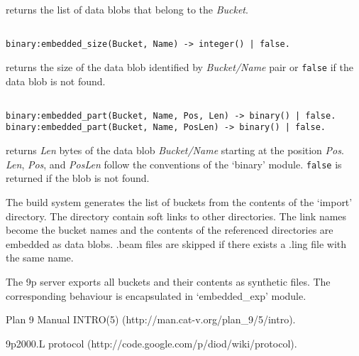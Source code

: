 returns the list of data blobs that belong to the \emph{Bucket}.

\begin{adjustwidth}{2.5em}{2.5em}
\begin{verbatim}

binary:embedded_size(Bucket, Name) -> integer() | false.

\end{verbatim}
\end{adjustwidth}

returns the size of the data blob identified by \emph{Bucket\slash Name} pair or \texttt{false} if
the data blob is not found.

\begin{adjustwidth}{2.5em}{2.5em}
\begin{verbatim}

binary:embedded_part(Bucket, Name, Pos, Len) -> binary() | false.
binary:embedded_part(Bucket, Name, PosLen) -> binary() | false.

\end{verbatim}
\end{adjustwidth}

returns \emph{Len} bytes of the data blob \emph{Bucket\slash Name} starting at the position
\emph{Pos}. \emph{Len}, \emph{Pos}, and \emph{PosLen} follow the conventions of the `binary' module.
\texttt{false} is returned if the blob is not found.

The build system generates the list of buckets from the contents of the `import'
directory. The directory contain soft links to other directories. The link names
become the bucket names and the contents of the referenced directories are
embedded as data blobs. .beam files are skipped if there exists a .ling file
with the same name.

The 9p server exports all buckets and their contents as synthetic files. The
corresponding behaviour is encapsulated in `embedded\_exp' module.

\begin{thebibliography}{0}

Plan 9 Manual INTRO(5) (http:/\slash man.cat-v.org\slash plan\_9\slash 5\slash intro).


9p2000.L protocol (http:/\slash code.google.com\slash p\slash diod\slash wiki\slash protocol). 


\end{thebibliography}





